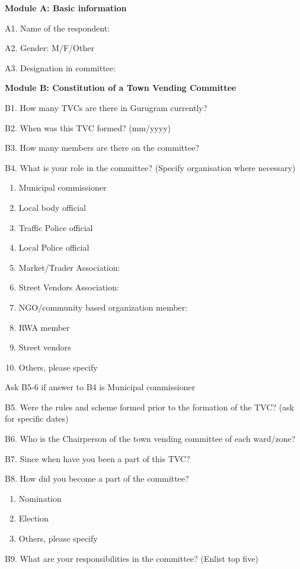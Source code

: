 \documentclass[a4paper, 12pt, twoside]{article}
\begin{document}
{{\begin{mdframed}[backgroundcolor=gray!20]
\textbf{Module A: Basic information}

A1. Name of the respondent: 

A2. Gender: M/F/Other

A3. Designation in committee:


\textbf{Module B: Constitution of a Town Vending Committee}

B1. How many TVCs are there in Gurugram currently?

B2. When was this TVC formed? (mm/yyyy)

B3. How many members are there on the committee?

B4. What is your role in the committee? (Specify organisation where necessary)

\begin{enumerate}[nosep]
\item Municipal commissioner
\item Local body official
\item Traffic Police official
\item Local Police official
\item Market/Trader Association:
\item Street Vendors Association:
\item NGO/community based organization member:
\item RWA member
\item Street vendors
\item Others, please specify
\end{enumerate}

Ask B5-6 if answer to B4 is Municipal commissioner

B5. Were the rules and scheme formed prior to the formation of the TVC? (ask for specific dates)

B6. Who is the Chairperson of the town vending committee of each ward/zone?

B7. Since when have you been a part of this TVC?

B8. How did you become a part of the committee?
\begin{enumerate}[nosep]
\item Nomination
\item Election
\item Others, please specify
\end{enumerate}

B9. What are your responsibilities in the committee? (Enlist top five)


\end{mdframed}}}
\end{document}
